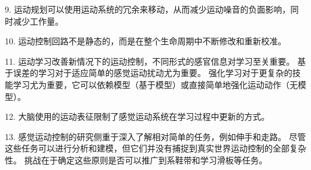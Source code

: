 9. 运动规划可以使用运动系统的冗余来移动，从而减少运动噪音的负面影响，同时减少工作量。


10. 运动控制回路不是静态的，而是在整个生命周期中不断修改和重新校准。


11. 运动学习改善新情况下的运动控制，不同形式的感官信息对学习至关重要。
基于误差的学习对于适应简单的感觉运动扰动尤为重要。
强化学习对于更复杂的技能学习尤为重要，它可以依赖模型（基于模型）或直接简单地强化运动动作（无模型）。


12. 大脑使用的运动表征限制了感觉运动系统在学习过程中更新的方式。


13. 感觉运动控制的研究侧重于深入了解相对简单的任务，例如伸手和走路。
尽管这些任务可以进行分析和建模，但它们并没有捕捉到真实世界运动控制的全部复杂性。
挑战在于确定这些原则是否可以推广到系鞋带和学习滑板等任务。


